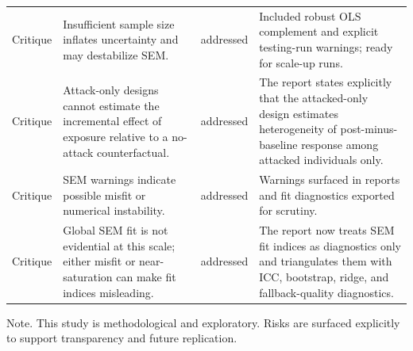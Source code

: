 \begin{table}[htbp]
\begin{threeparttable}
\begin{tabular}{llll}
Critique & Insufficient sample size inflates uncertainty and may destabilize SEM. & addressed & Included robust OLS complement and explicit testing-run warnings; ready for scale-up runs. \\
Critique & Attack-only designs cannot estimate the incremental effect of exposure relative to a no-attack counterfactual. & addressed & The report states explicitly that the attacked-only design estimates heterogeneity of post-minus-baseline response among attacked individuals only. \\
Critique & SEM warnings indicate possible misfit or numerical instability. & addressed & Warnings surfaced in reports and fit diagnostics exported for scrutiny. \\
Critique & Global SEM fit is not evidential at this scale; either misfit or near-saturation can make fit indices misleading. & addressed & The report now treats SEM fit indices as diagnostics only and triangulates them with ICC, bootstrap, ridge, and fallback-quality diagnostics. \\
\bottomrule
\end{tabular}
\begin{tablenotes}[flushleft]
\footnotesize
\item Note. This study is methodological and exploratory. Risks are surfaced explicitly to support transparency and future replication.
\end{tablenotes}
\end{threeparttable}
\end{table}